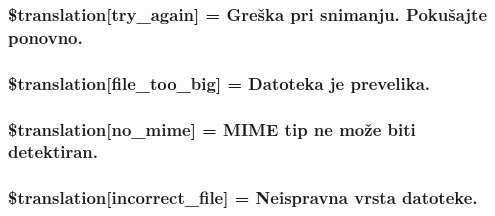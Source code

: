 \subsubsection[{\$translation}]{\setlength{\rightskip}{0pt plus 5cm}\$translation\mbox{[}\textquotesingle{}try\+\_\+again\textquotesingle{}\mbox{]} = \textquotesingle{}Greška pri snimanju. Pokušajte ponovno.\textquotesingle{}}\label{class_8upload_8hr___h_r_8php_a3afc377bd803683314f413a814243066}
\hypertarget{class_8upload_8hr___h_r_8php_a476278eb4a0c3df56af068e2d511a741}{}
\subsubsection[{\$translation}]{\setlength{\rightskip}{0pt plus 5cm}\$translation\mbox{[}\textquotesingle{}file\+\_\+too\+\_\+big\textquotesingle{}\mbox{]} = \textquotesingle{}Datoteka je prevelika.\textquotesingle{}}\label{class_8upload_8hr___h_r_8php_a476278eb4a0c3df56af068e2d511a741}
\hypertarget{class_8upload_8hr___h_r_8php_a191a55df8e3bb7f3c51b70f3c1932e02}{}
\subsubsection[{\$translation}]{\setlength{\rightskip}{0pt plus 5cm}\$translation\mbox{[}\textquotesingle{}no\+\_\+mime\textquotesingle{}\mbox{]} = \textquotesingle{}M\+I\+M\+E tip ne može biti detektiran.\textquotesingle{}}\label{class_8upload_8hr___h_r_8php_a191a55df8e3bb7f3c51b70f3c1932e02}
\hypertarget{class_8upload_8hr___h_r_8php_a4d32343e2699edd6fd435f9c832cb9c7}{}
\subsubsection[{\$translation}]{\setlength{\rightskip}{0pt plus 5cm}\$translation\mbox{[}\textquotesingle{}incorrect\+\_\+file\textquotesingle{}\mbox{]} = \textquotesingle{}Neispravna vrsta datoteke.\textquotesingle{}}\label{class_8upload_8hr___h_r_8php_a4d32343e2699edd6fd435f9c832cb9c7}
\hypertarget{class_8upload_8hr___h_r_8php_a0dd3e4930ca1f59ae280f4b1006525cd}{}
